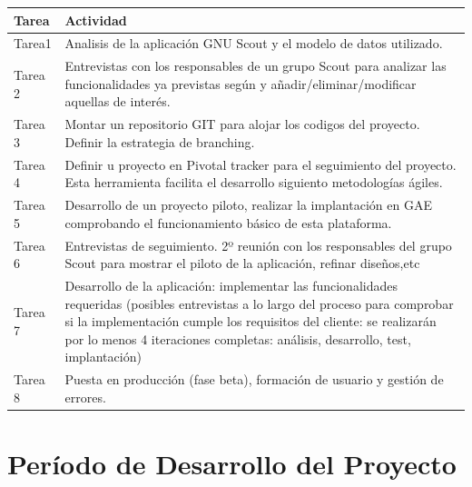 \begin{tabular}{|p{25mm}|p{80mm}|} \hline 
\textbf{Tarea } & \textbf{Actividad} \\ \hline
Tarea1 &
Analisis de la aplicación GNU Scout y el modelo de datos utilizado.
\\
\hline

Tarea 2 &
Entrevistas con los responsables de un grupo Scout para analizar las funcionalidades ya
previstas según y añadir/eliminar/modificar aquellas de interés.
\\
\hline

Tarea 3 &
Montar un repositorio GIT \cite{URL:GitHub} para alojar los codigos del proyecto. Definir la
estrategia de branching.
\\
\hline

Tarea 4 &
Definir u proyecto en Pivotal tracker para el seguimiento del proyecto. Esta herramienta
facilita el desarrollo siguiento metodologías ágiles.
\\
\hline

Tarea 5 & 
Desarrollo de un proyecto piloto, realizar la implantación en GAE comprobando el 
funcionamiento básico de esta plataforma.
\\
\hline

Tarea 6 &
Entrevistas de seguimiento. 2º reunión con los responsables del grupo Scout para
mostrar el piloto de la aplicación, refinar diseños,etc
\\
\hline

Tarea 7 &
Desarrollo de la aplicación: implementar las funcionalidades requeridas (posibles
entrevistas a lo largo del proceso para comprobar si la implementación cumple los requisitos
del cliente: se realizarán por lo menos 4 iteraciones completas: análisis, desarrollo, test, implantación)
\\
\hline

Tarea 8 &
Puesta en producción (fase beta), formación de usuario y gestión de errores.
\\
\hline

\end{tabular}


\section{Período de Desarrollo del Proyecto}
\label{1:sec:4}

